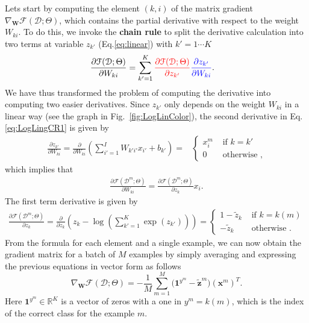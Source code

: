 Lets start by computing the element $(k,i)$ of the matrix gradient
$\nabla_\mathbf{W}\mathcal{F}(\mathcal{D};\Theta)$, which contains the partial
derivative with respect to the weight $W_{ki}$. To do this, we invoke the \textbf{chain rule} to split the derivative calculation into two terms at variable $z_{k'}$ (Eq.\ref{eq:linear}) with $k'=1\cdots K$
%
\begin{align}
\frac{\partial \mathcal{F}(\mathcal{D};\Theta)}{\partial W_{ki}} & = \sum_{k'=1}^{K} { \color{red} \frac{\partial \mathcal{F}(\mathcal{D};\Theta)}{\partial z_{k'}} }{ \color{blue} \frac{\partial z_{k'}}{\partial W_{ki}}}.
\label{eq:LogLingCR1}
\end{align}
%
We have thus transformed the problem of computing the derivative into computing two easier derivatives. Since $z_{k'}$ only depends on the weight $W_{ki}$ in a linear way (see the graph in Fig.~\ref{fig:LogLinColor}), the second derivative in Eq.\ref{eq:LogLingCR1} is given by
\begin{align}
\frac{\partial z_{k'}}{\partial W_{ki}} = \frac{\partial }{\partial W_{ki}}\left(\sum_{i'=1}^{I} W_{k'i'} x_{i'} + b_{k'} \right) = 
  &\begin{cases}
      x_i^m  &  \mbox{ if } k = k'\\ 
      0    &  \mbox{ otherwise },
  \end{cases}
  \label{eq:partialLinear}
\end{align}
%
\noindent which implies that 
%
\begin{align}
\frac{\partial \mathcal{F}(\mathcal{D}^m;\Theta)}{\partial W_{ki}} = \frac{\partial \mathcal{F}(\mathcal{D}^m;\Theta) }{\partial z_k} x_i .
\label{eq:gradlogPycx}
\end{align}
%
\noindent The first term derivative is given by
%
\begin{align}
\frac{\partial \mathcal{F}(\mathcal{D}^m;\Theta)}{\partial z_{k}} = \frac{\partial }{\partial z_{k}}\left(z_k - \log\left(\sum_{k'=1}^{K} \exp(z_{k'}) \right) \right) = 
  \begin{cases}
      1 - \tilde{z}_k  &  \mbox{ if } k = k(m)\\ 
      -\tilde{z}_k    &  \mbox{ otherwise }.
  \end{cases}
  \label{eq:patialSoftmax}
\end{align}
%
From the formula for each element and a single example, we can now obtain the gradient matrix for a batch of $M$ examples by simply averaging and expressing the previous equations in vector form as follows
\begin{equation}
\nabla_\mathbf{W}\mathcal{F}(\mathcal{D};\Theta) = -\frac{1}{M}\sum_{m=1}^{M} \Big(\mathrm{\mathbf{1}}^{y^m} - \tilde{\mathbf{z}}^m \Big) \left(\mathbf{x}^m\right)^T.
\label{gradWeigths}
\end{equation}
%
Here $\mathrm{\mathbf{1}}^{y^m} \in \mathbb{R}^{K}$ is a vector of zeros with a one in $y^m=k(m)$, which is 
the index of the correct class for the example $m$. 


